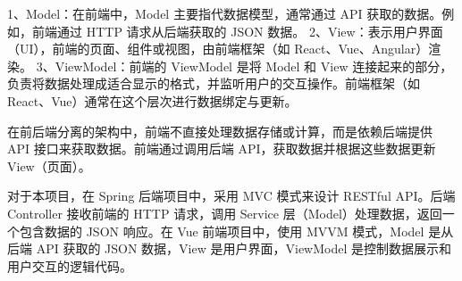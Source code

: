 1、Model：在前端中，Model 主要指代数据模型，通常通过 API 获取的数据。例如，前端通过 HTTP 请求从后端获取的 JSON 数据。
2、View：表示用户界面（UI），前端的页面、组件或视图，由前端框架（如 React、Vue、Angular）渲染。
3、ViewModel：前端的 ViewModel 是将 Model 和 View 连接起来的部分，负责将数据处理成适合显示的格式，并监听用户的交互操作。前端框架（如 React、Vue）通常在这个层次进行数据绑定与更新。

在前后端分离的架构中，前端不直接处理数据存储或计算，而是依赖后端提供 API 接口来获取数据。前端通过调用后端 API，获取数据并根据这些数据更新 View（页面）。

对于本项目，在 Spring 后端项目中，采用 MVC 模式来设计 RESTful API。后端 Controller 接收前端的 HTTP 请求，调用 Service 层（Model）处理数据，返回一个包含数据的 JSON 响应。在 Vue 前端项目中，使用 MVVM 模式，Model 是从后端 API 获取的 JSON 数据，View 是用户界面，ViewModel 是控制数据展示和用户交互的逻辑代码。
